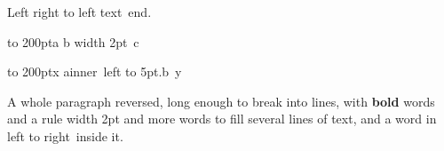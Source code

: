 \documentclass{article}
\begin{document}
Left \beginR right to left text\endR\ end.\par
\noindent\hbox to 200pt{\beginR a \hfil b \vrule width 2pt\ c\endR}\par
\noindent\hbox to 200pt{x \beginR a\hbox{inner \beginL left\endL} \leaders\hbox to 5pt{.\hss}\hfil b\endR\ y}\par
\beginR A whole paragraph reversed, long enough to break into lines,
with \textbf{bold} words and a rule \vrule width 2pt and more words to
fill several lines of text, and a word in \beginL left to right\endL\
inside it.\endR\par
\end{document}
